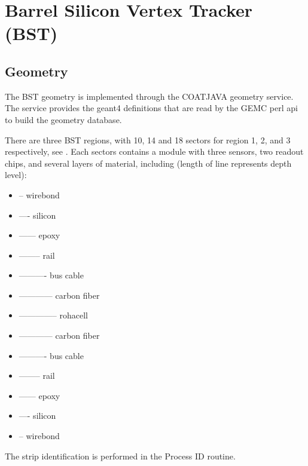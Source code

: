 \section{Barrel Silicon Vertex Tracker (BST)}


\subsection{Geometry}


The BST geometry is implemented through the COATJAVA geometry service.
The service provides the geant4 definitions that are read by the GEMC perl api to build the geometry database.

There are three BST regions, with 10, 14 and 18 sectors for region 1, 2, and 3 respectively, see .
Each sectors contains a module with three sensors, two readout chips, and several layers of material,
including (length of line represents depth level):

\begin{itemize}
	\item -- wirebond
	\item ---- silicon
	\item ------ epoxy
	\item -------- rail
	\item ---------- bus cable
	\item ------------ carbon fiber
	\item -------------- rohacell
	\item ------------ carbon fiber
	\item ---------- bus cable
	\item -------- rail
	\item ------ epoxy
	\item ---- silicon
	\item -- wirebond
\end{itemize}

The strip identification is performed in the Process ID routine.


